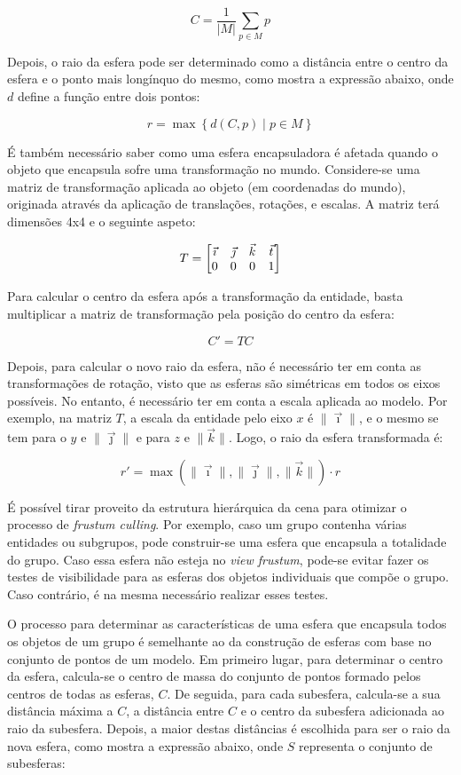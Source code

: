 \documentclass[12pt, a4paper]{article}
\begin{document}
$$
C = \frac{1}{|M|} \sum_{p \in M} p
$$

Depois, o raio da esfera pode ser determinado como a distância entre o centro da esfera e o ponto
mais longínquo do mesmo, como mostra a expressão abaixo, onde $d$ define a função entre dois pontos:

$$
r = \max \left \lbrace d(C, p) \mid p \in M \right \rbrace
$$

É também necessário saber como uma esfera encapsuladora é afetada quando o objeto que encapsula
sofre uma transformação no mundo. Considere-se uma matriz de transformação aplicada ao objeto (em
coordenadas do mundo), originada através da aplicação de translações, rotações, e escalas. A matriz
terá dimensões 4x4 e o seguinte aspeto:

$$
\bgroup
    T =
    \begin{bmatrix}
        \vec \imath & \vec \jmath & \vec k & \vec t \\
        0 & 0 & 0 & 1
    \end{bmatrix}
\egroup
$$

Para calcular o centro da esfera após a transformação da entidade, basta multiplicar a matriz de
transformação pela posição do centro da esfera:

$$
C' = T C
$$

Depois, para calcular o novo raio da esfera, não é necessário ter em conta as transformações de
rotação, visto que as esferas são simétricas em todos os eixos possíveis. No entanto, é necessário
ter em conta a escala aplicada ao modelo. Por exemplo, na matriz $T$, a escala da entidade pelo
eixo $x$ é $\lVert \vec \imath \rVert$, e o mesmo se tem para o $y$ e $\lVert \vec \jmath \rVert$ e
para $z$ e $\lVert \vec k \rVert$. Logo, o raio da esfera transformada é:

$$
r' = \max(\lVert \vec \imath \rVert, \lVert \vec \jmath \rVert, \lVert \vec k \rVert) \cdot r
$$

É possível tirar proveito da estrutura hierárquica da cena para otimizar o processo de
\emph{frustum culling}. Por exemplo, caso um grupo contenha várias entidades ou subgrupos, pode
construir-se uma esfera que encapsula a totalidade do grupo. Caso essa esfera não esteja no
\emph{view frustum}, pode-se evitar fazer os testes de visibilidade para as esferas dos objetos
individuais que compõe o grupo. Caso contrário, é na mesma necessário realizar esses testes.

O processo para determinar as características de uma esfera que encapsula todos os objetos de um
grupo é semelhante ao da construção de esferas com base no conjunto de pontos de um modelo. Em
primeiro lugar, para determinar o centro da esfera, calcula-se o centro de massa do conjunto de
pontos formado pelos centros de todas as esferas, $C$. De seguida, para cada subesfera, calcula-se
a sua distância máxima a $C$, a distância entre $C$ e o centro da subesfera adicionada ao raio da
subesfera. Depois, a maior destas distâncias é escolhida para ser o raio da nova esfera, como mostra
a expressão abaixo, onde $S$ representa o conjunto de subesferas:
\end{document}

